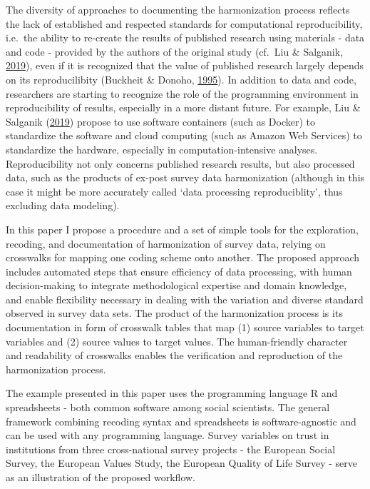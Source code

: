 \documentclass[12pt,]{article}
\begin{document}
The diversity of approaches to documenting the harmonization process reflects the lack of established and respected standards for computational reproducibility, i.e.~the ability to re-create the results of published research using materials - data and code - provided by the authors of the original study (cf.~Liu \& Salganik, \protect\hyperlink{ref-Liu2019}{2019}), even if it is recognized that the value of published research largely depends on its reproducilibity (Buckheit \& Donoho, \protect\hyperlink{ref-Buckheit1995}{1995}). In addition to data and code, researchers are starting to recognize the role of the programming environment in reproducibility of results, especially in a more distant future. For example, Liu \& Salganik (\protect\hyperlink{ref-Liu2019}{2019}) propose to use software containers (such as Docker) to standardize the software and cloud computing (such as Amazon Web Services) to standardize the hardware, especially in computation-intensive analyses. Reproducibility not only concerns published research results, but also processed data, such as the products of ex-post survey data harmonization (although in this case it might be more accurately called `data processing reproduciblity', thus excluding data modeling).

In this paper I propose a procedure and a set of simple tools for the exploration, recoding, and documentation of harmonization of survey data, relying on crosswalks for mapping one coding scheme onto another. The proposed approach includes automated steps that ensure efficiency of data processing, with human decision-making to integrate methodological expertise and domain knowledge, and enable flexibility necessary in dealing with the variation and diverse standard observed in survey data sets. The product of the harmonization process is its documentation in form of crosswalk tables that map (1) source variables to target variables and (2) source values to target values. The human-friendly character and readability of crosswalks enables the verification and reproduction of the harmonization process.

The example presented in this paper uses the programming language R and spreadsheets - both common software among social scientists. The general framework combining recoding syntax and spreadsheets is software-agnostic and can be used with any programming language. Survey variables on trust in institutions from three cross-national survey projects - the European Social Survey, the European Values Study, the European Quality of Life Survey - serve as an illustration of the proposed workflow.
\end{document}
